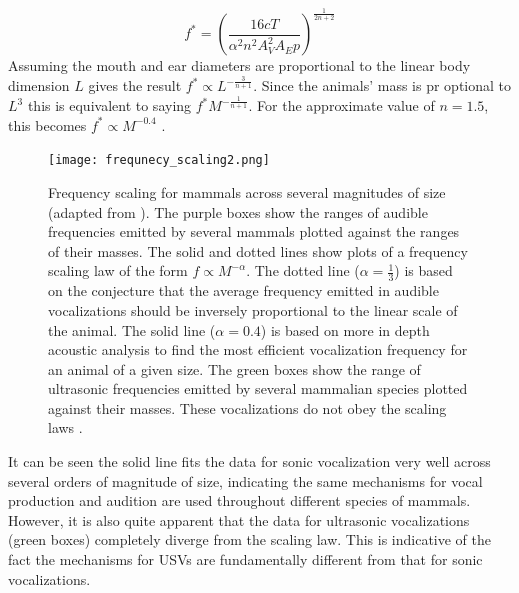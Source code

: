\documentclass[12pt, letter]{report}
\begin{document}
\begin{equation}
f^*= \left( \frac{16 c T}{\alpha^2 n^2 A_V^2 A_E p} \right)^\frac{1}{2n+2}
\end{equation}
Assuming the mouth and ear diameters are proportional to the linear body dimension $L$ gives the result $f^* \propto L^{-\frac{3}{n+1}}$. Since the animals' mass is pr optional to $L^3$ this is equivalent to saying $f^* M^{-\frac{1}{n+1}}$. For the approximate value of $n=1.5$, this becomes $f^* \propto M^{-0.4}$ \cite{Fletcher2010}.
\begin{figure}
\centering
\texttt{[image: frequnecy\_scaling2.png]}
\label{fig:frequency_scaling} 
\caption{Frequency scaling for mammals across several magnitudes of size (adapted from \cite{Fletcher2010}). The purple boxes show the ranges of audible frequencies emitted by several mammals plotted against the ranges of their masses. The solid and dotted lines show plots of a frequency scaling law of the form $f\propto M^{-\alpha}$. The dotted line ($\alpha=\frac{1}{3}$) is based on the conjecture that the average frequency emitted in audible vocalizations should be inversely proportional to the linear scale of the animal. The solid line ($\alpha=0.4$) is based on more in depth acoustic analysis to find the most efficient vocalization frequency for an animal of a given size. The green boxes show the range of ultrasonic frequencies emitted by several mammalian species plotted against their masses. These vocalizations do not obey the scaling laws \cite{white1998,berry1970natural,Fenton1998,Jones2006,bogdanowicz1994,Frankel2009,Whitehead2009,Rendell1999,Kastelein2000,Jefferson1993}.}
\label{fig:scaling_law}
\end{figure}
It can be seen the solid line fits the data for sonic vocalization very well across several orders of magnitude of size, indicating the same mechanisms for vocal production and audition are used throughout different species of mammals. However, it is also quite apparent that the data for ultrasonic vocalizations (green boxes) completely diverge from the scaling law. This is indicative of the fact the mechanisms for USVs are fundamentally different from that for sonic vocalizations.
\end{document}
